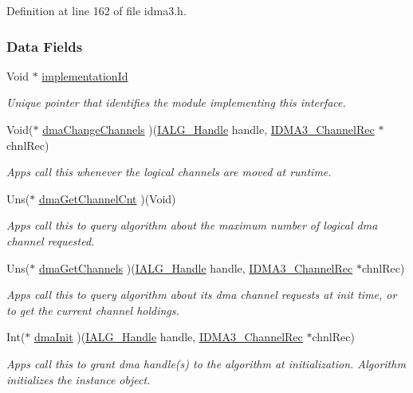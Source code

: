 Definition at line 162 of file idma3.h.\subsubsection*{Data Fields}
\begin{CompactItemize}
\item 
Void $\ast$ \hyperlink{struct_i_d_m_a3___fxns_4ee5aca6d6f29e0e09c83eaae2a44aec}{implementation\-Id}
\begin{CompactList}\small\item\em Unique pointer that identifies the module implementing this interface. \item\end{CompactList}\item 
Void($\ast$ \hyperlink{struct_i_d_m_a3___fxns_1b05e503408ceb2849174d520932aa08}{dma\-Change\-Channels} )(\hyperlink{struct_i_a_l_g___obj}{IALG\_\-Handle} handle, \hyperlink{struct_i_d_m_a3___channel_rec}{IDMA3\_\-Channel\-Rec} $\ast$chnl\-Rec)
\begin{CompactList}\small\item\em Apps call this whenever the logical channels are moved at runtime. \item\end{CompactList}\item 
Uns($\ast$ \hyperlink{struct_i_d_m_a3___fxns_2f893a5ce598a401aecf9e79a5d973d2}{dma\-Get\-Channel\-Cnt} )(Void)
\begin{CompactList}\small\item\em Apps call this to query algorithm about the maximum number of logical dma channel requested. \item\end{CompactList}\item 
Uns($\ast$ \hyperlink{struct_i_d_m_a3___fxns_91d2edc4e5202ab46028a272cf8f7ad6}{dma\-Get\-Channels} )(\hyperlink{struct_i_a_l_g___obj}{IALG\_\-Handle} handle, \hyperlink{struct_i_d_m_a3___channel_rec}{IDMA3\_\-Channel\-Rec} $\ast$chnl\-Rec)
\begin{CompactList}\small\item\em Apps call this to query algorithm about its dma channel requests at init time, or to get the current channel holdings. \item\end{CompactList}\item 
Int($\ast$ \hyperlink{struct_i_d_m_a3___fxns_080578d0edab90882b4fe8124c74eea2}{dma\-Init} )(\hyperlink{struct_i_a_l_g___obj}{IALG\_\-Handle} handle, \hyperlink{struct_i_d_m_a3___channel_rec}{IDMA3\_\-Channel\-Rec} $\ast$chnl\-Rec)
\begin{CompactList}\small\item\em Apps call this to grant dma handle(s) to the algorithm at initialization. Algorithm initializes the instance object. \item\end{CompactList}\end{CompactItemize}



